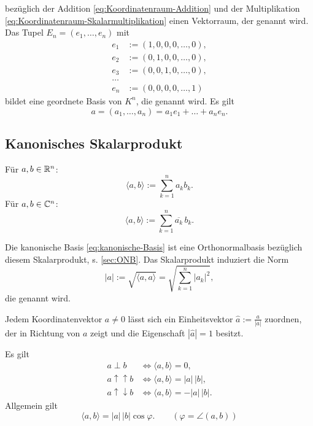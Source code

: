 bezüglich der Addition \eqref{eq:Koordinatenraum-Addition}
und der Multiplikation \eqref{eq:Koordinatenraum-Skalarmultiplikation}
einen Vektorraum, der  genannt wird.
Das Tupel $E_n=(e_1,\ldots,e_n)$ mit
\begin{equation}\label{eq:kanonische-Basis}
\begin{split}
e_1 &:= (1,0,0,0,\ldots, 0),\\
e_2 &:= (0,1,0,0,\ldots, 0),\\
e_3 &:= (0,0,1,0,\ldots, 0),\\
\ldots\\
e_n &:= (0,0,0,0,\ldots, 1)
\end{split}
\end{equation}
bildet eine geordnete Basis von $K^n$, die 
genannt wird. Es gilt
\begin{equation}
a = (a_1,\ldots,a_n) = a_1 e_1+\ldots+a_n e_n.
\end{equation}

\newpage
\subsection{Kanonisches Skalarprodukt}
\begin{definition}\mbox{}\newline
Für $a,b\in\mathbb R^n$:
\begin{equation}
\langle a,b\rangle := \sum_{k=1}^n a_k b_k.
\end{equation}
Für $a,b\in\mathbb C^n$:
\begin{equation}
\langle a,b\rangle := \sum_{k=1}^n \overline{a_k}\,b_k.
\end{equation}
\end{definition}
\noindent
Die kanonische Basis \eqref{eq:kanonische-Basis} ist eine
Orthonormalbasis bezüglich diesem Skalarprodukt, s. \ref{sec:ONB}.
Das Skalarprodukt induziert die Norm
\begin{equation}
|a| := \sqrt{\langle a,a\rangle} = \sqrt{\textstyle \sum_{k=1}^n |a_k|^2},
\end{equation}
die  genannt wird.

Jedem Koordinatenvektor $a\ne 0$ lässt sich ein Einheitsvektor
$\hat a:=\frac{a}{|a|}$ zuordnen, der in Richtung von $a$ zeigt
und die Eigenschaft $|\hat a|=1$ besitzt.

Es gilt
\begin{align}
a\perp b &\iff \langle a,b\rangle=0,\\
a\uparrow\uparrow b &\iff \langle a,b\rangle = |a|\,|b|,\\
a\uparrow\downarrow b &\iff \langle a,b\rangle = -|a|\,|b|.
\end{align}
Allgemein gilt
\begin{equation}
\langle a,b\rangle = |a|\,|b|\cos\varphi.\qquad(\varphi=\angle (a,b))
\end{equation}

